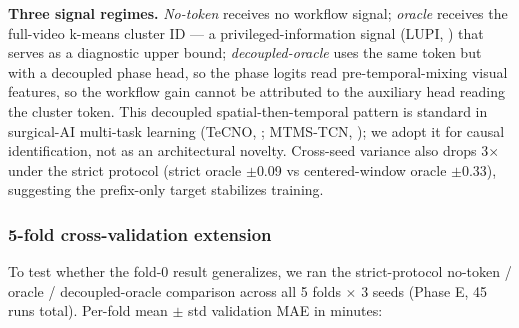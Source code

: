 \textbf{Three signal regimes.} \emph{No-token} receives no workflow
signal; \emph{oracle} receives the full-video k-means cluster ID — a
privileged-information signal (LUPI, \citealt{vapnik2009lupi}) that
serves as a diagnostic upper bound; \emph{decoupled-oracle} uses the
same token but with a decoupled phase head, so the phase logits read
pre-temporal-mixing visual features, so the workflow gain cannot be
attributed to the auxiliary head reading the cluster token. This decoupled spatial-then-temporal
pattern is standard in surgical-AI multi-task learning (TeCNO,
\citealt{czempiel2020tecno}; MTMS-TCN, \citealt{ramesh2021mtmstcn}); we
adopt it for causal identification, not as an architectural novelty.
Cross-seed variance also drops 3$\times$ under the strict protocol
(strict oracle $\pm$0.09 vs centered-window oracle $\pm$0.33), suggesting
the prefix-only target stabilizes training.

\subsubsection{5-fold cross-validation extension}\label{fold-cross-validation-extension}

To test whether the fold-0 result generalizes, we ran the
strict-protocol no-token / oracle / decoupled-oracle comparison across
all 5 folds $\times$ 3 seeds (Phase E, 45 runs total). Per-fold mean $\pm$ std
validation MAE in minutes:

